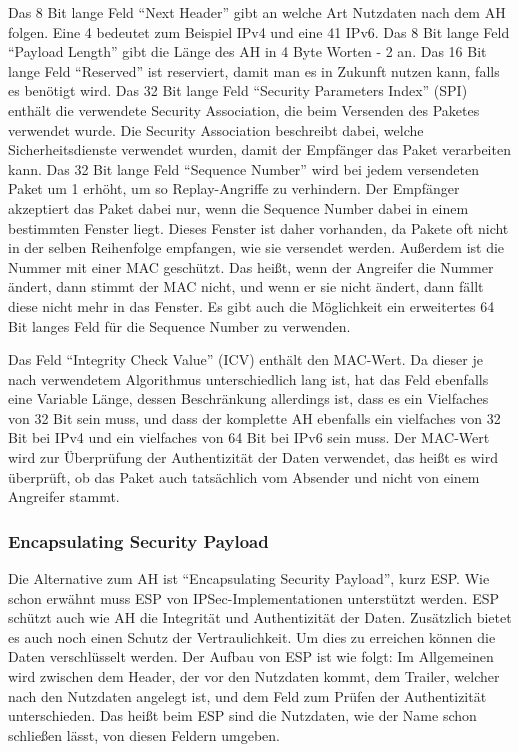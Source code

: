 \documentclass[12pt]{scrartcl}
\begin{document}
Das 8 Bit lange Feld "`Next Header"' gibt an welche Art Nutzdaten nach dem AH folgen. Eine 4 bedeutet zum Beispiel IPv4 und eine 41 IPv6. Das 8 Bit lange Feld "`Payload Length"' gibt die Länge des AH in 4 Byte Worten - 2 an. Das 16 Bit lange Feld "`Reserved"' ist reserviert, damit man es in Zukunft nutzen kann, falls es benötigt wird. Das 32 Bit lange Feld "`Security Parameters Index"' (SPI) enthält die verwendete Security Association, die beim Versenden des Paketes verwendet wurde. Die Security Association beschreibt dabei, welche Sicherheitsdienste verwendet wurden, damit der Empfänger das Paket verarbeiten kann. Das 32 Bit lange Feld "`Sequence Number"' wird bei jedem versendeten Paket um 1 erhöht, um so Replay-Angriffe zu verhindern. Der Empfänger akzeptiert das Paket dabei nur, wenn die Sequence Number dabei in einem bestimmten Fenster liegt. Dieses Fenster ist daher vorhanden, da Pakete oft nicht in der selben Reihenfolge empfangen, wie sie versendet werden. Außerdem ist die Nummer mit einer MAC geschützt. Das heißt, wenn der Angreifer die Nummer ändert, dann stimmt der MAC nicht, und wenn er sie nicht ändert, dann fällt diese nicht mehr in das Fenster. Es gibt auch die Möglichkeit ein erweitertes 64 Bit langes Feld für die Sequence Number zu verwenden. 

Das Feld "`Integrity Check Value"' (ICV) enthält den MAC-Wert. Da dieser je nach verwendetem Algorithmus unterschiedlich lang ist, hat das Feld ebenfalls eine Variable Länge, dessen Beschränkung allerdings ist, dass es ein Vielfaches von 32 Bit sein muss, und dass der komplette AH ebenfalls ein vielfaches von 32 Bit bei IPv4 und ein vielfaches von 64 Bit bei IPv6 sein muss. Der MAC-Wert wird zur Überprüfung der Authentizität der Daten verwendet, das heißt es wird überprüft, ob das Paket auch tatsächlich vom Absender und nicht von einem Angreifer stammt.
\subsubsection{Encapsulating Security Payload}
Die Alternative zum AH ist "`Encapsulating Security Payload"', kurz ESP. Wie schon erwähnt muss ESP von IPSec-Implementationen unterstützt werden. 
ESP schützt auch wie AH die Integrität und Authentizität der Daten. Zusätzlich bietet es auch noch einen Schutz der Vertraulichkeit. Um dies zu erreichen können die Daten verschlüsselt werden. Der Aufbau von ESP ist wie folgt:
Im Allgemeinen wird zwischen dem Header, der vor den Nutzdaten kommt, dem Trailer, welcher nach den Nutzdaten angelegt ist, und dem Feld zum Prüfen der Authentizität unterschieden. Das heißt beim ESP sind die Nutzdaten, wie der Name schon schließen lässt, von diesen Feldern umgeben.
\end{document}
